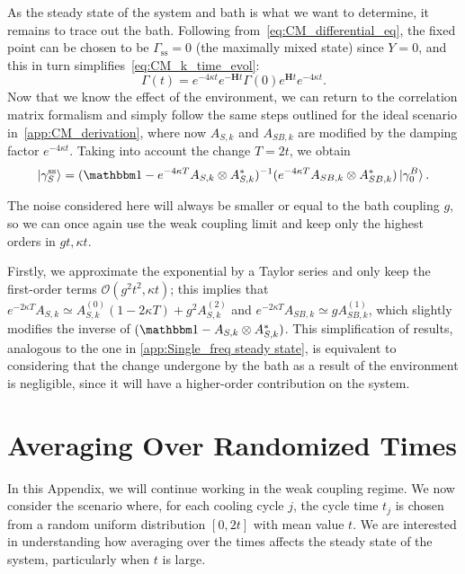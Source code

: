 As the steady state of the system and bath is what we want to determine, it remains to trace out the bath. Following from~\cref{eq:CM_differential_eq}, the fixed point can be chosen to be $\Gamma_\text{ss}=0$ (the maximally mixed state) since $Y=0$, and this in turn simplifies~\cref{eq:CM_k_time_evol}:
\begin{equation}
    \Gamma(t)=e^{-4\kappa t}e^{-\textbf{H}t}\Gamma(0)e^{\textbf{H}t}e^{-4\kappa t}.\label{eq:CM_simplified_time_evol}
\end{equation}
Now that we know the effect of the environment, we can return to the correlation matrix formalism and simply follow the same steps outlined for the ideal scenario in~\cref{app:CM_derivation}, where now $A_{S,k}$ and $A_{SB,k}$ are modified by the damping factor $e^{-4\kappa t}$. Taking into account the change $T=2t$, we obtain
\begin{equation}
    \ket{\gamma_S^\text{ss}} = (\Id -e^{-4\kappa T} A_{S,k} \otimes A^*_{S,k})^{-1} (e^{-4\kappa T}A_{SB,k} \otimes A^*_{SB,k}) \ket{\gamma_0^B}.
    \label{eq:steady_state_equation_vectorized}
\end{equation}

The noise considered here will always be smaller or equal to the bath coupling $g$, so we can once again use the weak coupling limit and keep only the highest orders in $gt,\kappa t$.

Firstly, we approximate the exponential by a Taylor series and only keep the first-order terms $\mathcal{O}(g^2t^2,\kappa t)$; this implies that $e^{-2\kappa T}A_{S,k} \simeq A_{S,k}^{(0)}(1-2\kappa T) + g^2 A_{S,k}^{(2)}$ and $e^{-2\kappa T}A_{SB,k} \simeq gA_{SB,k}^{(1)}$, which slightly modifies the inverse of $(\Id-A_{S,k}\otimes A^*_{S,k})$. This simplification of results, analogous to the one in \cref{app:Single_freq steady state}, is equivalent to considering that the change undergone by the bath as a result of the environment is negligible, since it will have a higher-order contribution on the system.


\section{Averaging Over Randomized Times}
\label{app:long_time_averages}
In this Appendix, we will continue working in the weak coupling regime. We now consider the scenario where, for each cooling cycle $j$, the cycle time $t_j$ is chosen from a random uniform distribution $[0, 2t]$ with mean value $t$. We are interested in understanding how averaging over the times affects the steady state of the system, particularly when $t$ is large.

